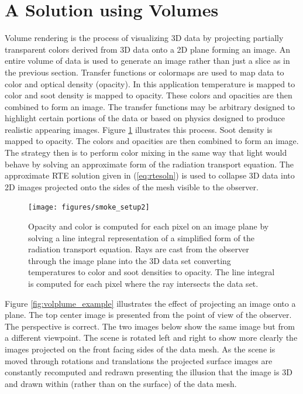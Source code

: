 {\section{A Solution using Volumes}
Volume rendering is the process of visualizing 3D data by projecting partially transparent colors derived from 3D data onto a 2D plane forming an image.  An entire volume of data is used to generate an image rather than just a slice as in the previous section.  Transfer functions or colormaps are used to map data to color and optical density (opacity).  In this application temperature is mapped to color and soot density is mapped to opacity.  These colors and opacities are then combined to form an image.  The transfer functions may be arbitrary designed to highlight certain portions of the data or based on physics designed to produce realistic appearing images.  Figure \ref{figsmokesetup2} illustrates this process.  
Soot density is mapped to opacity.  The colors and opacities are then combined to form an image.  The strategy then is to perform color mixing in the same way that light would behave by solving an approximate form of the radiation transport equation.  The approximate RTE solution given in (\ref{eq:rtesoln})  is used to collapse 3D data into 2D images projected onto the sides of the mesh visible to the observer.

\begin{figure}[\figoptions]
\begin{center}
\texttt{[image: figures/smoke\_setup2]}
\end{center}
\caption[Opacity and color is computed for each pixel on an image plane by solving a line integral
representation of a simplified form of the radiation transport equation.]{Opacity and color is computed for each pixel on an image plane by solving a line integral
representation of a simplified form of the radiation transport equation.  Rays are cast from the observer through the  image plane into the 3D data set converting temperatures to color and soot densities to opacity.  The line integral is computed for each pixel where the ray intersects the data set.
}
\label{figsmokesetup2}
\end{figure}

Figure \ref{fig:volplume_example} illustrates the effect of projecting an image onto a plane.  The top center image is presented from the point of view of the observer.  The perspective is correct.  The two images below show the same image but from a different viewpoint.  The scene is rotated left and right to show more clearly the images projected on the front facing sides of the data mesh.  As the scene is moved through rotations and translations the projected surface images are constantly recomputed and redrawn presenting the illusion that the image is 3D and drawn within (rather than on the surface) of the data mesh.


}
